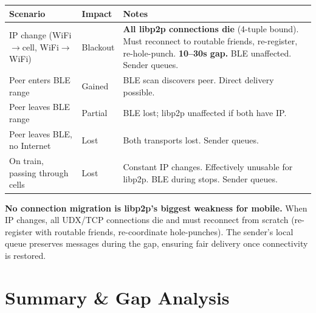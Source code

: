 \documentclass[11pt,a4paper]{article}
\begin{document}
\begin{table}[H]
\centering\small
\begin{tabular}{L{4cm} C{2cm} L{5.5cm}}
\toprule
\textbf{Scenario} & \textbf{Impact} & \textbf{Notes} \\
\midrule
IP change (WiFi$\to$cell, WiFi$\to$WiFi) & Blackout & \textbf{All libp2p connections die} (4-tuple bound). Must reconnect to routable friends, re-register, re-hole-punch. \textbf{10--30s gap.} BLE unaffected. Sender queues. \\
Peer enters BLE range & Gained & BLE scan discovers peer. Direct delivery possible. \\
Peer leaves BLE range & Partial & BLE lost; libp2p unaffected if both have IP. \\
Peer leaves BLE, no Internet & Lost & Both transports lost. Sender queues. \\
On train, passing through cells & Lost & Constant IP changes. Effectively unusable for libp2p. BLE during stops. Sender queues. \\
\bottomrule
\end{tabular}
\end{table}

\textbf{No connection migration is libp2p's biggest weakness for mobile.} When IP changes, all UDX/TCP connections die and must reconnect from scratch (re-register with routable friends, re-coordinate hole-punches). The sender's local queue preserves messages during the gap, ensuring fair delivery once connectivity is restored.

\section{Summary \& Gap Analysis}
\end{document}
